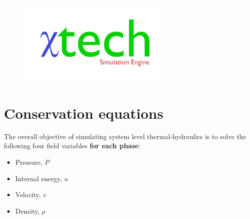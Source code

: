 \documentclass[11pt,letterpaper,titlepage]{article}
\begin{document}
\begin{titlepage}
\begin{center}
\begin{minipage}[c]{0.45\textwidth}
\begin{figure}[H]
				\includegraphics[width=3in]{Logo2_Medium.png}
			\end{figure}
		\end{minipage}
	\end{center}
	\vspace{2cm}
\end{titlepage}


\pagestyle{fancy}
\cfoot{}
\lfoot{\truncate{14cm}{\NSCDOCTITLE}}
\rhead{}
\chead{\currentname}
\lhead{}
\renewcommand{\footrulewidth}{0.4pt}
\tableofcontents
{}

\listoffigures
{}


\newpage
{}
\section{Conservation equations}
The overall objective of simulating system level thermal-hydraulics is to solve the following four field variables \textbf{for each phase}:
\begin{itemize}
\item Pressure, $P$
\item Internal energy, $u$
\item Velocity, $v$
\item Density, $\rho$
\end{itemize}
\end{document}
